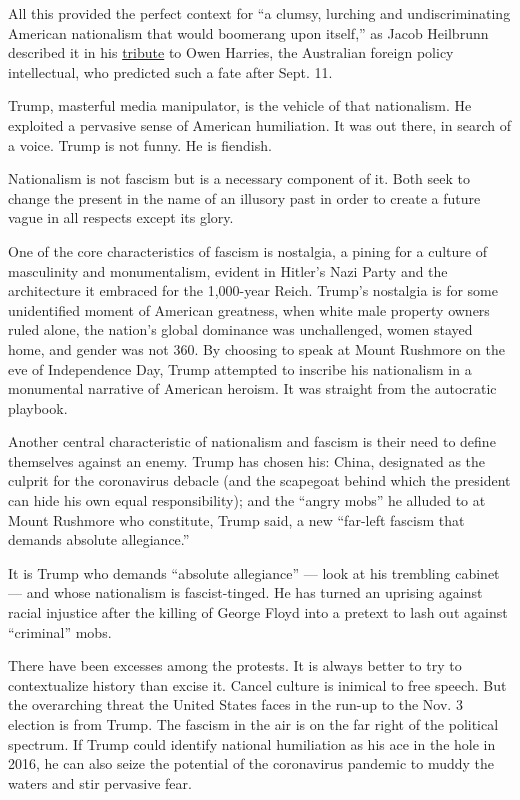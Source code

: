 All this provided the perfect context for ``a clumsy, lurching and
undiscriminating American nationalism that would boomerang upon
itself,'' as Jacob Heilbrunn described it in his
\href{https://www.lowyinstitute.org/the-interpreter/owen-harries-never-ideologue}{tribute}
to Owen Harries, the Australian foreign policy intellectual, who
predicted such a fate after Sept. 11.

Trump, masterful media manipulator, is the vehicle of that nationalism.
He exploited a pervasive sense of American humiliation. It was out
there, in search of a voice. Trump is not funny. He is fiendish.

Nationalism is not fascism but is a necessary component of it. Both seek
to change the present in the name of an illusory past in order to create
a future vague in all respects except its glory.

One of the core characteristics of fascism is nostalgia, a pining for a
culture of masculinity and monumentalism, evident in Hitler's Nazi Party
and the architecture it embraced for the 1,000-year Reich. Trump's
nostalgia is for some unidentified moment of American greatness, when
white male property owners ruled alone, the nation's global dominance
was unchallenged, women stayed home, and gender was not 360. By choosing
to speak at Mount Rushmore on the eve of Independence Day, Trump
attempted to inscribe his nationalism in a monumental narrative of
American heroism. It was straight from the autocratic playbook.

Another central characteristic of nationalism and fascism is their need
to define themselves against an enemy. Trump has chosen his: China,
designated as the culprit for the coronavirus debacle (and the scapegoat
behind which the president can hide his own equal responsibility); and
the ``angry mobs'' he alluded to at Mount Rushmore who constitute, Trump
said, a new ``far-left fascism that demands absolute allegiance.''

It is Trump who demands ``absolute allegiance'' --- look at his
trembling cabinet --- and whose nationalism is fascist-tinged. He has
turned an uprising against racial injustice after the killing of George
Floyd into a pretext to lash out against ``criminal'' mobs.

There have been excesses among the protests. It is always better to try
to contextualize history than excise it. Cancel culture is inimical to
free speech. But the overarching threat the United States faces in the
run-up to the Nov. 3 election is from Trump. The fascism in the air is
on the far right of the political spectrum. If Trump could identify
national humiliation as his ace in the hole in 2016, he can also seize
the potential of the coronavirus pandemic to muddy the waters and stir
pervasive fear.

